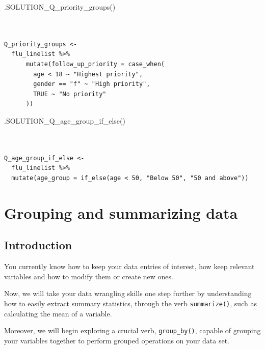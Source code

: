 \documentclass[
  letterpaper,
  DIV=11,
  numbers=noendperiod]{scrreprt}
\newenvironment{Shaded}{\begin{snugshade}}{\end{snugshade}}
\newcommand{\FunctionTok}[1]{\textcolor[rgb]{0.28,0.35,0.67}{#1}}
\newcommand{\NormalTok}[1]{\textcolor[rgb]{0.00,0.23,0.31}{#1}}
\begin{document}
\begin{Shaded}
\begin{Highlighting}[]
\FunctionTok{.SOLUTION\_Q\_priority\_groups}\NormalTok{()}
\end{Highlighting}
\end{Shaded}

\begin{verbatim}


Q_priority_groups <- 
  flu_linelist %>% 
      mutate(follow_up_priority = case_when(
        age < 18 ~ "Highest priority", 
        gender == "f" ~ "High priority", 
        TRUE ~ "No priority"
      ))
\end{verbatim}

\begin{Shaded}
\begin{Highlighting}[]
\FunctionTok{.SOLUTION\_Q\_age\_group\_if\_else}\NormalTok{()}
\end{Highlighting}
\end{Shaded}

\begin{verbatim}


Q_age_group_if_else <- 
  flu_linelist %>% 
  mutate(age_group = if_else(age < 50, "Below 50", "50 and above"))
\end{verbatim}


\hypertarget{grouping-and-summarizing-data}{%
\chapter{Grouping and summarizing
data}\label{grouping-and-summarizing-data}}

\hypertarget{introduction-11}{%
\section{Introduction}\label{introduction-11}}

You currently know how to keep your data entries of interest, how keep
relevant variables and how to modify them or create new ones.

Now, we will take your data wrangling skills one step further by
understanding how to easily extract summary statistics, through the verb
\texttt{summarize()}, such as calculating the mean of a variable.

Moreover, we will begin exploring a crucial verb, \texttt{group\_by()},
capable of grouping your variables together to perform grouped
operations on your data set.
\end{document}
